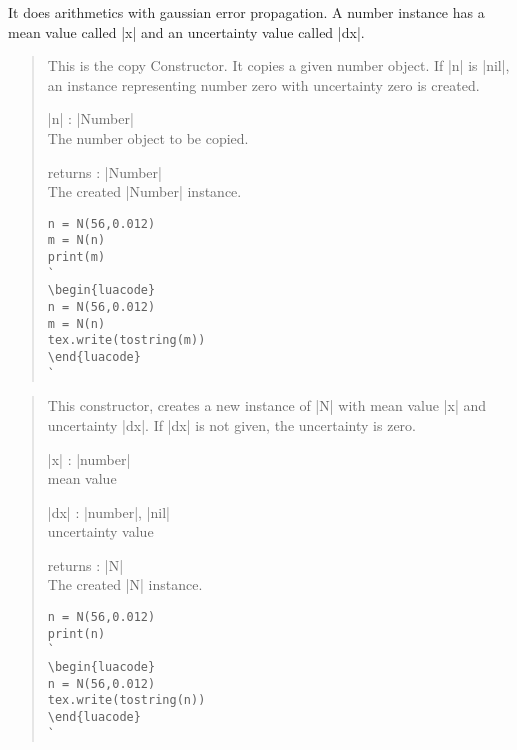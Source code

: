 \documentclass{ltxdoc}
\begin{document}
It does arithmetics with gaussian error propagation. A number instance has a mean value called |x| and an uncertainty value called |dx|.

\begin{quote}
  This is the copy Constructor. It copies a given number object. If |n| is |nil|, an instance representing number zero with uncertainty zero is created.

  \begin{description}
  \item |n| : |Number|\\
    The number object to be copied.

  \item returns : |Number|\\
    The created |Number| instance.
  \end{description}

\begin{lstlisting}
n = N(56,0.012)
m = N(n)
print(m)
`
\begin{luacode}
n = N(56,0.012)
m = N(n)
tex.write(tostring(m))
\end{luacode}
`
\end{lstlisting}

\end{quote}


\begin{quote}
  This constructor, creates a new instance of |N| with mean value |x| and uncertainty |dx|. If |dx| is not given, the uncertainty is zero.

  \begin{description}
  \item |x| : |number|\\
    mean value

  \item |dx| : |number|, |nil|\\
    uncertainty value

  \item returns : |N|\\
    The created |N| instance.
  \end{description}

\begin{lstlisting}
n = N(56,0.012)
print(n)
`
\begin{luacode}
n = N(56,0.012)
tex.write(tostring(n))
\end{luacode}
`
\end{lstlisting}

\end{quote}
\end{document}
